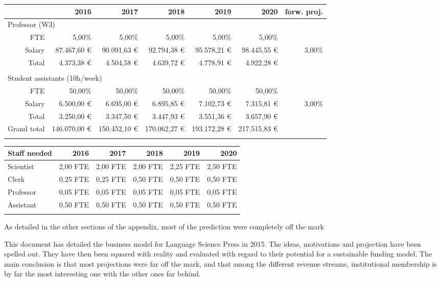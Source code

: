 \documentclass[output=guidelines,nonflat,smallfont,
draftmode
]{langsci/langscibook}
\newcommand{\background}[1]{ 
  \vspace{5mm}
  \renewcommand{\tblslinecolour}{lsDarkBlue}
  \tblssy[red]{explore2}{Background}{\vspace*{-5mm}#1}
}
\newcommand{\langscisolution}[1]{
  \renewcommand{\tblslinecolour}{lsLightBlue}
  \tblssy{langsci}{LangSci solution}{\vspace*{-5mm}#1}
}
\newcommand{\evaluation}[1]{
  \renewcommand{\tblslinecolour}{lsLightOrange}
  \tblssy{receipt}{Evaluation}{\vspace*{-5mm}#1}
}
\newcommand{\othersolutions}[1]{
  \renewcommand{\tblslinecolour}{lsDarkGreenOne}
  \tblssy{more}{Other solutions}{\vspace*{-5mm}#1}
}
\renewcommand{\tblssy}[4][black!12]{%
  \renewcommand{\langscisymbol}{#2}\renewcommand{\tblsboxcolor}{#1}
  \begin{mdframed}[style=yellowexercise,frametitle={#3}]
    #4
  \end{mdframed}
}
\begin{document}
{{\begin{tabular}{lrrrrrrr}
\midrule
& & \textbf{2016} & \textbf{2017} & \textbf{2018} & \textbf{2019} & \textbf{2020} & \textbf{forw. proj.}\\
\midrule 
\multicolumn{5}{l}{ Professor (W3)}\\
\midrule
&  FTE &  5,00\% &  5,00\% &  5,00\% &  5,00\% &  5,00\% & ~\\
&  Salary &  87.467,60 € &  90.091,63 € &  92.794,38 € &  95.578,21 € &  98.445,55 € &  3,00\%\\
 &  Total &  4.373,38 € &  4.504,58 € &  4.639,72 € &  4.778,91 € &  4.922,28 € & ~\\
\\
\multicolumn{5}{l}{ Student assistants (10h/week)}\\
\midrule
&  FTE &  50,00\% &  50,00\% &  50,00\% &  50,00\% &  50,00\% & ~\\
&  Salary &  6.500,00 € &  6.695,00 € &  6.895,85 € &  7.102,73 € &  7.315,81 € &  3,00\%\\
 &  Total &  3.250,00 € &  3.347,50 € &  3.447,93 € &  3.551,36 € &  3.657,90 € & ~\\
\midrule
\multicolumn{2}{l}{Grand total}  &  146.070,00 € &  150.452,10 € &  170.062,27 € &  193.172,28 € &  217.515,83 € & ~\\
\lspbottomrule
\end{tabular}
}

\bigskip
{\footnotesize
\noindent
\begin{tabularx}{\textwidth}{Xrrrrr}
\lsptoprule
Staff needed  & \textbf{2016} & \textbf{2017} & \textbf{2018} & \textbf{2019} & \textbf{2020}\\
\midrule
Scientist &  2,00 FTE &  2,00 FTE &  2,00 FTE &  2,25 FTE &  2,50 FTE\\
Clerk &  0,25 FTE &  0,25 FTE &  0,50 FTE &  0,50 FTE &  0,50 FTE\\
Professor &  0,05 FTE &  0,05 FTE &  0,05 FTE &  0,05 FTE &  0,05 FTE\\
Assistant &  0,50 FTE &  0,50 FTE &  0,50 FTE &  0,50 FTE &  0,50 FTE\\
\lspbottomrule
\end{tabularx} 
}
}
\evaluation{As detailed in the other sections of the appendix, most of the prediction were completely off the mark}

This document has detailed the business model for Language Science Press in 2015. The ideas, motivations and projection have been spelled out. They have then been squared with reality and evaluated with regard to their potential for a sustainable funding model. The main conclusion is that most projections were far off the mark, and that among the different revenue streams, institutional membership is by far the most interesting one with the other ones far behind. 

\end{document}
